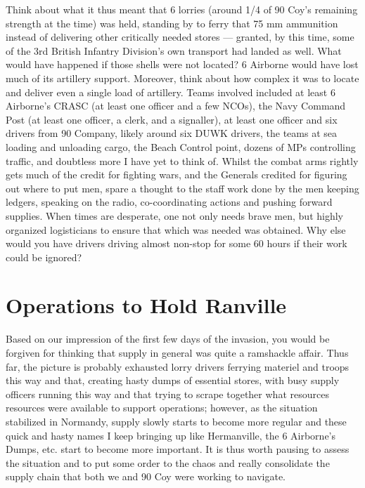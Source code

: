 \documentclass[noraggedright]{turabian-researchpaper}
\begin{document}
Think about what it thus meant that 6 lorries (around 1/4 of 90 Coy's remaining
strength at the time) was held, standing by to ferry that 75 mm ammunition 
instead of delivering other critically needed stores --- granted, by this time,
some of
the 3rd British Infantry Division's own transport had landed as well.  What
would have happened if those shells were not located?  6 Airborne would have
lost much of its artillery support.  Moreover, think about how complex it was
to locate and deliver even a single load of artillery.  Teams involved included
at least 6 Airborne's CRASC (at least one officer and a few NCOs), the Navy
Command Post (at least one officer, a clerk, and a signaller), at least one
officer and six drivers from 90 Company, likely around six DUWK drivers, the
teams at sea loading and unloading cargo, the Beach Control point, dozens of 
MPs controlling traffic, and doubtless more I have yet to think of.  Whilst 
the combat arms rightly gets much of the credit for fighting wars, and the
Generals credited for figuring out where to put men, spare a thought to the
staff work done by the men keeping ledgers, speaking on the radio, 
co-coordinating actions and pushing forward supplies.  When times are desperate, 
one not only needs brave men, but highly organized logisticians to ensure
that which was needed was obtained. Why else would you have drivers driving
almost non-stop for some 60 hours if their work could be ignored?


\section{Operations to Hold Ranville} %

Based on our impression of the first few days of the invasion, you would be 
forgiven for thinking that supply in general was quite a ramshackle affair.
Thus far, the picture is probably exhausted lorry drivers ferrying materiel and
troops this way and that, creating hasty dumps of essential stores, with busy
supply officers running this way and that trying to scrape together what 
resources resources were available to support operations; however, as the
situation stabilized in Normandy, supply slowly starts to become more regular
and these quick and hasty names I keep bringing up like Hermanville, the
6 Airborne's Dumps, etc. start to become more important.  It is thus
worth pausing to assess the situation and to put some order to the chaos and
really consolidate the supply chain that both we and 90 Coy were working to 
navigate. 
\end{document}
